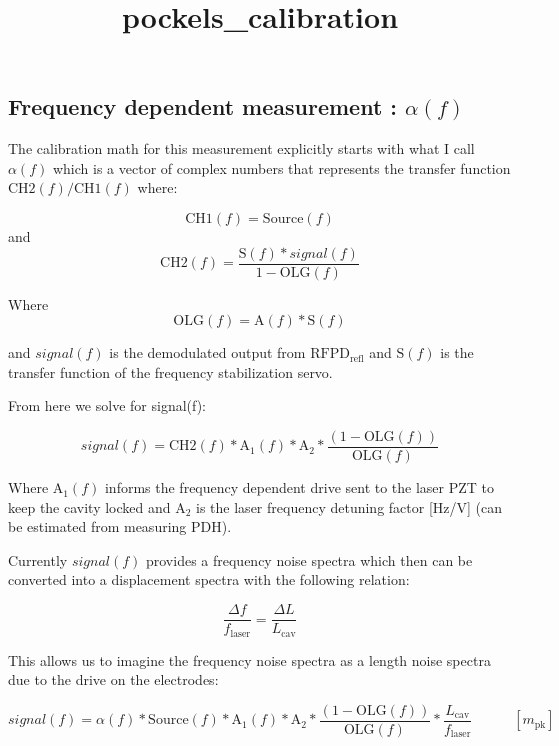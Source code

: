 \documentclass[11pt]{article}
\title{pockels\_calibration}
\begin{document}
    

    \hypertarget{frequency-dependent-measurement-alphaf}{%
\subsection{\texorpdfstring{Frequency dependent measurement :
\(\alpha(f)\)}{Frequency dependent measurement : \textbackslash alpha(f)}}\label{frequency-dependent-measurement-alphaf}}

    

    The calibration math for this measurement explicitly starts with what I
call \(\alpha(f)\) which is a vector of complex numbers that represents
the transfer function \(\mathrm{CH2}(f)/\mathrm{CH1}(f)\) where:

\[\mathrm{CH1}(f) = \mathrm{Source}(f)\] and
\[\mathrm{CH2}(f) = \frac{\mathrm{S}(f)* signal(f)}{1-\mathrm{OLG}(f)}\]

Where \[\mathrm{OLG}(f) = \mathrm{A}(f)* \mathrm{S}(f)\]

and \(signal(f)\) is the demodulated output from
\(\mathrm{RFPD}_\mathrm{refl}\) and \(\mathrm{S}(f)\) is the transfer
function of the frequency stabilization servo.

From here we solve for signal(f):

\[signal(f) = \mathrm{CH2}(f) * \mathrm{A}_{1}(f) * \mathrm{A}_2* \frac{(1-\mathrm{OLG}(f))}{\mathrm{OLG}(f)}\]

Where \(\mathrm{A}_{1}(f)\) informs the frequency dependent drive sent
to the laser PZT to keep the cavity locked and \(\mathrm{A}_2\) is the
laser frequency detuning factor {[}Hz/V{]} (can be estimated from
measuring PDH).

Currently \(signal(f)\) provides a frequency noise spectra which then
can be converted into a displacement spectra with the following
relation:

\[\frac{\Delta f}{f_\mathrm{laser}} = \frac{\Delta L}{L_\mathrm{cav}}\]

This allows us to imagine the frequency noise spectra as a length noise
spectra due to the drive on the electrodes:

\[signal(f) = \alpha(f)* \mathrm{Source}(f) * \mathrm{A}_{1}(f) * \mathrm{A}_2* \frac{(1-\mathrm{OLG}(f))}{\mathrm{OLG}(f)} * \frac{L_\mathrm{cav}}{f_\mathrm{laser}}\hspace{35pt} [m_\mathrm{pk}]\]
\end{document}

